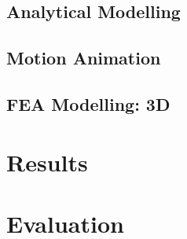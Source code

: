 \documentclass[a4paper, 11pt]{article}
\begin{document}
\subsection{Analytical Modelling}
\subsection{Motion Animation}
\subsection{FEA Modelling: 3D}
\section{Results}
\section{Evaluation}
\end{document}

